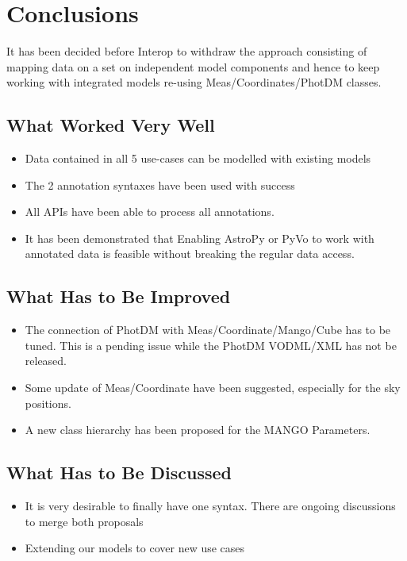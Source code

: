 \documentclass[11pt,a4paper]{ivoa}
\begin{document}
 
 \section{Conclusions}
 
 It has been decided before Interop to withdraw the approach consisting of mapping data on a set on independent model components and hence to keep working with integrated models re-using Meas/Coordinates/PhotDM classes.
 
\subsection{What Worked Very Well}

\begin{itemize}
\item Data contained in all 5 use-cases can be modelled with existing models
\item The 2 annotation syntaxes have been used with success
\item All  APIs have been able to process all annotations.
\item  It has been demonstrated that Enabling AstroPy or PyVo to work with annotated data is feasible without breaking the regular data access.
\end{itemize}

\subsection{What Has to Be Improved}

\begin{itemize}
\item The connection of PhotDM with Meas/Coordinate/Mango/Cube has to be tuned. This is a pending issue while the PhotDM VODML/XML has not be released.
\item Some update of Meas/Coordinate have been suggested, especially for the sky positions.
\item A new class hierarchy has been proposed for the MANGO Parameters.
\end{itemize}

\subsection{What Has to Be Discussed}

\begin{itemize}
\item It is very desirable to finally have one syntax. There are ongoing discussions to merge both proposals 
\item Extending our models to cover new use cases
\end{itemize}
\end{document}
